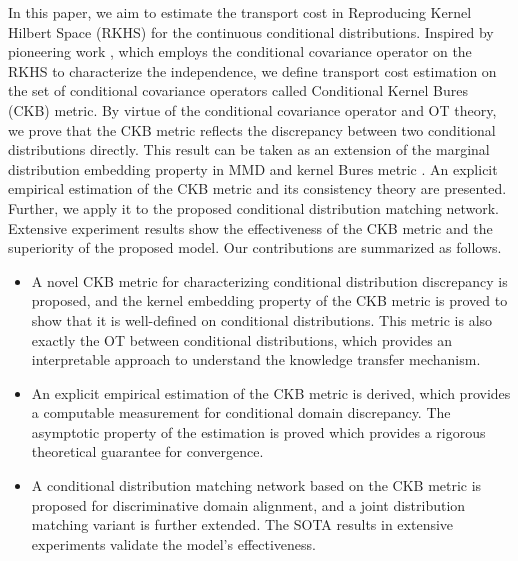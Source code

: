 \documentclass[final]{cvpr}
\begin{document}
In this paper, we aim to estimate the transport cost in Reproducing Kernel Hilbert Space (RKHS) for the continuous conditional distributions. Inspired by pioneering work \cite{fukumizu2009kernel}, which employs the conditional covariance operator on the RKHS to characterize the independence, we define transport cost estimation on the set of conditional covariance operators called Conditional Kernel Bures (CKB) metric. By virtue of the conditional covariance operator and OT theory, we prove that the CKB metric reflects the discrepancy between two conditional distributions directly. This result can be taken as an extension of the marginal distribution embedding property in MMD \cite{gretton2012kernel} and kernel Bures metric \cite{zhang2019optimal}. An explicit empirical estimation of the CKB metric and its consistency theory are presented. Further, we apply it to the proposed conditional distribution matching network. Extensive experiment results show the effectiveness of the CKB metric and the superiority of the proposed model. Our contributions are summarized as follows.
\begin{itemize}
\item A novel CKB metric for characterizing conditional distribution discrepancy is proposed, and the kernel embedding property of the CKB metric is proved to show that it is well-defined on conditional distributions. This metric is also exactly the OT between conditional distributions, which provides an interpretable approach to understand the knowledge transfer mechanism.
\item An explicit empirical estimation of the CKB metric is derived, which provides a computable measurement for conditional domain discrepancy. The asymptotic property of the estimation is proved which provides a rigorous theoretical guarantee for convergence.
\item A conditional distribution matching network based on the CKB metric is proposed for discriminative domain alignment, and a joint distribution matching variant is further extended. The SOTA results in extensive experiments validate the model's effectiveness.
\end{itemize}
\end{document}
